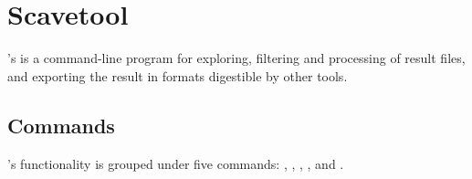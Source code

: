 

\section{Scavetool}
\label{sec:ana-sim:scavetool}

{\opp}'s  is a command-line program for exploring, filtering
and processing of result files, and exporting the result in formats
digestible by other tools.

\subsection{Commands}
\label{sec:ana-sim:scavetool:commands}

's functionality is grouped under five commands:
, , , , and .

